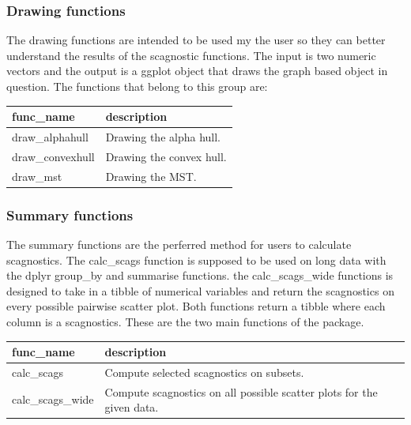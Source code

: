 \hypertarget{drawing-functions}{%
\subsubsection{Drawing functions}\label{drawing-functions}}

The drawing functions are intended to be used my the user so they can
better understand the results of the scagnostic functions. The input is
two numeric vectors and the output is a ggplot object that draws the
graph based object in question. The functions that belong to this group
are:

\begin{Schunk}

\begin{tabular}{l|l}
\hline
func\_name & description\\
\hline
draw\_alphahull & Drawing the alpha hull.\\
\hline
draw\_convexhull & Drawing the convex hull.\\
\hline
draw\_mst & Drawing the MST.\\
\hline
\end{tabular}

\end{Schunk}

\hypertarget{summary-functions}{%
\subsubsection{Summary functions}\label{summary-functions}}

The summary functions are the perferred method for users to calculate
scagnostics. The calc\_scags function is supposed to be used on long
data with the dplyr group\_by and summarise functions. the
calc\_scags\_wide functions is designed to take in a tibble of numerical
variables and return the scagnostics on every possible pairwise scatter
plot. Both functions return a tibble where each column is a scagnostics.
These are the two main functions of the package.

\begin{Schunk}

\begin{tabular}{l|l}
\hline
func\_name & description\\
\hline
calc\_scags & Compute selected scagnostics on subsets.\\
\hline
calc\_scags\_wide & Compute scagnostics on all possible scatter plots for the given data.\\
\hline
\end{tabular}

\end{Schunk}

